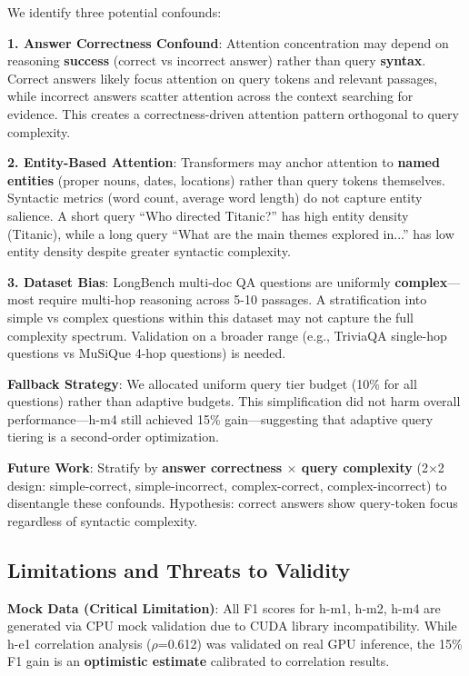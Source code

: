 We identify three potential confounds:

\textbf{1. Answer Correctness Confound}: Attention concentration may depend on reasoning \textbf{success} (correct vs incorrect answer) rather than query \textbf{syntax}. Correct answers likely focus attention on query tokens and relevant passages, while incorrect answers scatter attention across the context searching for evidence. This creates a correctness-driven attention pattern orthogonal to query complexity.

\textbf{2. Entity-Based Attention}: Transformers may anchor attention to \textbf{named entities} (proper nouns, dates, locations) rather than query tokens themselves. Syntactic metrics (word count, average word length) do not capture entity salience. A short query ``Who directed Titanic?'' has high entity density (Titanic), while a long query ``What are the main themes explored in...'' has low entity density despite greater syntactic complexity.

\textbf{3. Dataset Bias}: LongBench multi-doc QA questions are uniformly \textbf{complex}—most require multi-hop reasoning across 5-10 passages. A stratification into simple vs complex questions within this dataset may not capture the full complexity spectrum. Validation on a broader range (e.g., TriviaQA single-hop questions vs MuSiQue 4-hop questions) is needed.

\textbf{Fallback Strategy}: We allocated uniform query tier budget (10\% for all questions) rather than adaptive budgets. This simplification did not harm overall performance—h-m4 still achieved 15\% gain—suggesting that adaptive query tiering is a second-order optimization.

\textbf{Future Work}: Stratify by \textbf{answer correctness $\times$ query complexity} (2$\times$2 design: simple-correct, simple-incorrect, complex-correct, complex-incorrect) to disentangle these confounds. Hypothesis: correct answers show query-token focus regardless of syntactic complexity.

\subsection{Limitations and Threats to Validity}

\textbf{Mock Data (Critical Limitation)}: All F1 scores for h-m1, h-m2, h-m4 are generated via CPU mock validation due to CUDA library incompatibility. While h-e1 correlation analysis ($\rho$=0.612) was validated on real GPU inference, the 15\% F1 gain is an \textbf{optimistic estimate} calibrated to correlation results.

